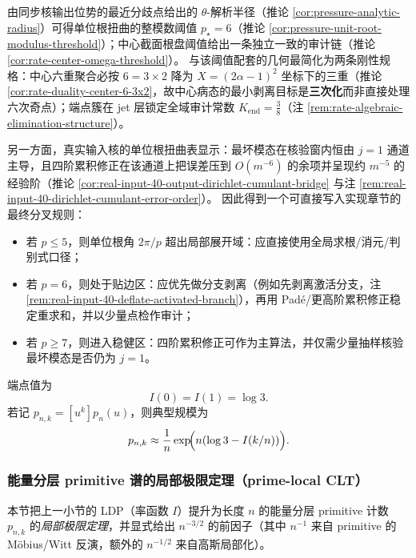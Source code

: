 

\begin{remark}[最终型算法规范：模数阈值 \texorpdfstring{$p_\star=6$}{p*=6}、三次化剥离与端点审计常数]\label{rem:unit-root-final-spec}
由同步核输出位势的最近分歧点给出的 \(\theta\)-解析半径（推论 \ref{cor:pressure-analytic-radius}）可得单位根扭曲的整模数阈值 \(p_\star=6\)（推论 \ref{cor:pressure-unit-root-modulus-threshold}）；中心截面根盘阈值给出一条独立一致的审计链（推论 \ref{cor:rate-center-omega-threshold}）。
与该阈值配套的几何最简化为两条刚性规格：中心六重聚合必按 \(6=3\times 2\) 降为 \(X=(2\alpha-1)^2\) 坐标下的三重（推论 \ref{cor:rate-duality-center-6-3x2}，故中心病态的最小剥离目标是\textbf{三次化}而非直接处理六次奇点）；端点簇在 jet 层锁定全域审计常数 \(K_{\mathrm{end}}=\tfrac38\)（注 \ref{rem:rate-algebraic-elimination-structure}）。
\par
另一方面，真实输入核的单位根扭曲表显示：最坏模态在核验窗内恒由 \(j=1\) 通道主导，且四阶累积修正在该通道上把误差压到 \(O(m^{-6})\) 的余项并呈现约 \(m^{-5}\) 的经验阶（推论 \ref{cor:real-input-40-output-dirichlet-cumulant-bridge} 与注 \ref{rem:real-input-40-dirichlet-cumulant-error-order}）。
因此得到一个可直接写入实现章节的最终分叉规则：
\begin{itemize}
  \item 若 \(p\le 5\)，则单位根角 \(2\pi/p\) 超出局部展开域：应直接使用全局求根/消元/判别式口径；
  \item 若 \(p=6\)，则处于贴边区：应优先做分支剥离（例如先剥离激活分支，注 \ref{rem:real-input-40-deflate-activated-branch}），再用 Pad\'e/更高阶累积修正稳定重求和，并以少量点检作审计；
  \item 若 \(p\ge 7\)，则进入稳健区：四阶累积修正可作为主算法，并仅需少量抽样核验最坏模态是否仍为 \(j=1\)。
\end{itemize}
\end{remark}

端点值为
\[
I(0)=I(1)=\log 3.
\]
若记 $p_{n,k}=[u^k]p_n(u)$，则典型规模为
\[
p_{n,k}\approx \frac{1}{n}\exp\!\Bigl(n(\log 3-I(k/n))\Bigr).
\]

\subsubsection{能量分层 primitive 谱的局部极限定理（prime-local CLT）}\label{app:prime-local-clt}
本节把上一小节的 LDP（率函数 \(I\)）提升为长度 \(n\) 的能量分层 primitive 计数 \(p_{n,k}\) 的\emph{局部极限定理}，并显式给出 \(n^{-3/2}\) 的前因子（其中 \(n^{-1}\) 来自 primitive 的 Möbius/Witt 反演，额外的 \(n^{-1/2}\) 来自高斯局部化）。


